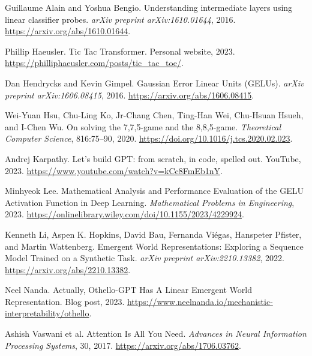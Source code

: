 \documentclass[11pt]{article}
\begin{document}
\begin{thebibliography}{99}

Guillaume Alain and Yoshua Bengio.
\newblock Understanding intermediate layers using linear classifier probes.
\newblock \emph{arXiv preprint arXiv:1610.01644}, 2016.
\newblock \url{https://arxiv.org/abs/1610.01644}.

Phillip Haeusler.
\newblock Tic Tac Transformer.
\newblock Personal website, 2023.
\newblock \url{https://philliphaeusler.com/posts/tic_tac_toe/}.

Dan Hendrycks and Kevin Gimpel.
\newblock Gaussian Error Linear Units (GELUs).
\newblock \emph{arXiv preprint arXiv:1606.08415}, 2016.
\newblock \url{https://arxiv.org/abs/1606.08415}.

Wei-Yuan Hsu, Chu-Ling Ko, Jr-Chang Chen, Ting-Han Wei, Chu-Hsuan Hsueh, and I-Chen Wu.
\newblock On solving the 7,7,5-game and the 8,8,5-game.
\newblock \emph{Theoretical Computer Science}, 816:75--90, 2020.
\newblock \url{https://doi.org/10.1016/j.tcs.2020.02.023}.

Andrej Karpathy.
\newblock Let's build GPT: from scratch, in code, spelled out.
\newblock YouTube, 2023.
\newblock \url{https://www.youtube.com/watch?v=kCc8FmEb1nY}.

Minhyeok Lee.
\newblock Mathematical Analysis and Performance Evaluation of the GELU Activation Function in Deep Learning.
\newblock \emph{Mathematical Problems in Engineering}, 2023.
\newblock \url{https://onlinelibrary.wiley.com/doi/10.1155/2023/4229924}.

Kenneth Li, Aspen K. Hopkins, David Bau, Fernanda Viégas, Hanspeter Pfister, and Martin Wattenberg.
\newblock Emergent World Representations: Exploring a Sequence Model Trained on a Synthetic Task.
\newblock \emph{arXiv preprint arXiv:2210.13382}, 2022.
\newblock \url{https://arxiv.org/abs/2210.13382}.

Neel Nanda.
\newblock Actually, Othello-GPT Has A Linear Emergent World Representation.
\newblock Blog post, 2023.
\newblock \url{https://www.neelnanda.io/mechanistic-interpretability/othello}.

Ashish Vaswani et al.
\newblock Attention Is All You Need.
\newblock \emph{Advances in Neural Information Processing Systems}, 30, 2017.
\newblock \url{https://arxiv.org/abs/1706.03762}.

\end{thebibliography}
    
\end{document}
